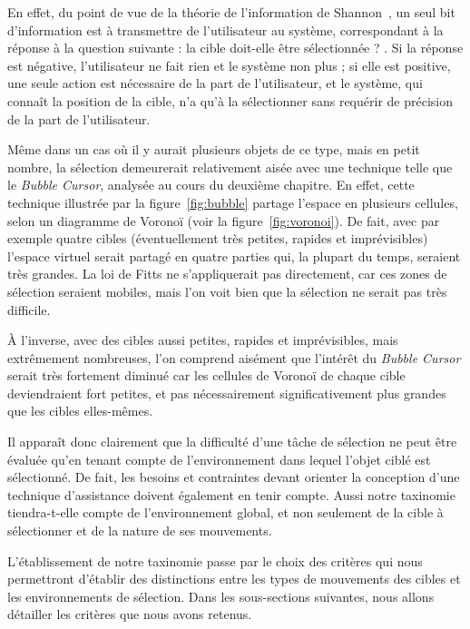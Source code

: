 	En effet, du point de vue de la théorie de l'information de Shannon~\cite{shannon2001mathematical}, un seul bit d'information est à transmettre de l'utilisateur au système, correspondant à la réponse à la question suivante : \og la cible doit-elle être sélectionnée ? \fg{}. Si la réponse est négative, l'utilisateur ne fait rien et le système non plus ; si elle est positive, une seule action est nécessaire de la part de l'utilisateur, et le système, qui connaît la position de la cible, n'a qu'à la sélectionner sans requérir de précision de la part de l'utilisateur.
	
	Même dans un cas où il y aurait plusieurs objets de ce type, mais en petit nombre, la sélection demeurerait relativement aisée avec une technique telle que le \emph{Bubble Cursor}, analysée au cours du deuxième chapitre. En effet, cette technique illustrée par la figure~\ref{fig:bubble} partage l'espace en plusieurs cellules, selon un diagramme de Voronoï (voir la figure~\ref{fig:voronoi}). De fait, avec par exemple quatre cibles (éventuellement très petites, rapides et imprévisibles) l'espace virtuel serait partagé en quatre parties qui, la plupart du temps, seraient très grandes. La loi de Fitts ne s'appliquerait pas directement, car ces zones de sélection seraient mobiles, mais l'on voit bien que la sélection ne serait pas très difficile.
	
	À l'inverse, avec des cibles aussi petites, rapides et imprévisibles, mais extrêmement nombreuses, l'on comprend aisément que l'intérêt du \emph{Bubble Cursor} serait très fortement diminué car les cellules de Voronoï de chaque cible deviendraient fort petites, et pas nécessairement significativement plus grandes que les cibles elles-mêmes.
	
	Il apparaît donc clairement que la difficulté d'une tâche de sélection ne peut être évaluée qu'en tenant compte de l'environnement dans lequel l'objet ciblé est sélectionné. De fait, les besoins et contraintes devant orienter la conception d'une technique d'assistance doivent également en tenir compte. Aussi notre taxinomie tiendra-t-elle compte de l'environnement global, et non seulement de la cible à sélectionner et de la nature de ses mouvements.


	L'établissement de notre taxinomie passe par le choix des critères qui nous permettront d'établir des distinctions entre les types de mouvements des cibles et les environnements de sélection. Dans les sous-sections suivantes, nous allons détailler les critères que nous avons retenus.
	
